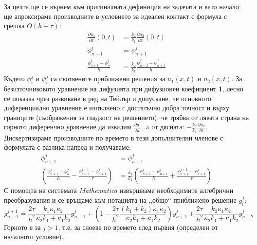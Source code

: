 За целта ще се върнем към оригиналната дефиниция на задачата и като начало ще апроксираме производните в условието за идеален контакт с формула с  грешка $O(h+\tau)$:
\begin{align*}
	\frac{\partial u_1}{\partial x} (0, t)  & = \frac{k_2}{k_1} \frac{\partial u_2}{\partial x} (0, t)     \\
	\phi_{n+1}^{j}                          & = \psi_{n+1}^{j}                                             \\
	\frac{\phi_{n+1}^{j} - \phi_{n}^{j}}{h} & =  \frac{k_2}{k_1} \frac{\psi_{n+2}^{j} - \psi_{n+1}^{j}}{h} 
\end{align*}
Където $\phi_i^j$ и $\psi_i^j$ са съотвените приближени решения за $u_1(x,t)$ и $u_2(x,t)$.
За безизточниковото уравнение на дифузията при дифузионен коефициент \textbf{1}, лесно се показва чрез развиване в ред на Тейлър и допускане, че основното диференциално уравнение
е изпълнено с достатъчно добра точност и върху границите (съображения за гладкост на решението), че трябва от лявата страна на горното диференчно уравнение да извадим $\frac{\partial u_1}{\partial t}$, a от дясната: $-\frac{k_2}{k_1}\frac{\partial u_2}{\partial t}$.
Дискертизираме производните по времето в тези допълнителни членове с формулата с разлика напред и получаваме:
\begin{align*}
	\phi_{n+1}^{j}                                                                                      & = \psi_{n+1}^{j}                                                                                                          \\
	\left(\frac{\phi_{n+1}^{j} - \phi_{n}^{j}}{h} - \frac{\phi_{n+1}^{j+1}-\phi_{n+1}^{j}}{\tau}\right) & =  \frac{k_2}{k_1} \left(\frac{\psi_{n+2}^{j} - \psi_{n+1}^{j}}{h} + \frac{ \psi_{n+1}^{j+1}-\psi_{n+1}^{j}}{\tau}\right) 
\end{align*}
С помощта на системата \textit{Mathematica} извършваме необходимите алгебрични преобразувания и се връщаме към нотацията на ,,общо`` приближено решение $y_i^j$:
\begin{equation}
	y_{n+1}^{j+1} = \frac{2 \tau}{h^2} \frac{k_1 \kappa_1 \kappa_2 }{\kappa_2 k_1 + \kappa_1 k_2} y_{n+1}^j + \left( 1 - \frac{2 \tau}{h^2}  \frac{(k_1 + k_2) \kappa_1 \kappa_2 }{\kappa_2 k_1 + \kappa_1 k_2} \right) y_{n+1}^j + \frac{2 \tau}{h^2} \frac{k_2 \kappa_1 \kappa_2 }{\kappa_2 k_1 + \kappa_1 k_2} y_{n+2}^j
\end{equation}
Горното е за $j > 1$, т.е. за слоеве по времето след първия (определен от началното условие).

